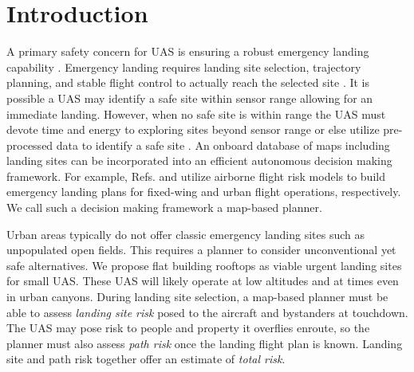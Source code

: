 \section{Introduction}

A primary safety concern for \ac{UAS} is ensuring a robust emergency landing capability \cite{winnefeld_unmanned_2011, degarmo_issues_2013}.  Emergency landing requires landing site selection, trajectory planning, and stable flight control to actually reach the selected site \cite{atkins_emergency_2006}. It is possible a UAS may identify a safe site within sensor range allowing for an immediate landing.  However, when no safe site is within range the UAS must devote time and energy to exploring sites beyond sensor range or else utilize pre-processed data to identify a safe site \cite{ten_harmsel_emergency_2017, ochoa_fail-safe_2017}.  An onboard database of maps including landing sites can be incorporated into an efficient autonomous decision making framework.  For example, Refs.  \cite{atkins_emergency_2006, meuleau_emergency_2009}  and \cite{sankararaman_towards_2017} utilize airborne flight risk models to build emergency landing plans for fixed-wing and urban flight operations, respectively. We call such a decision making framework a map-based planner.

Urban areas typically do not offer classic emergency landing sites such as unpopulated open fields. This requires a planner to consider unconventional yet safe alternatives. We propose flat building rooftops as viable urgent landing sites for small UAS.  These UAS will likely operate at low altitudes and at times even in urban canyons. During landing site selection, a map-based planner must be able to assess \emph{landing site risk} posed to the aircraft and bystanders at touchdown. The UAS may pose risk to people and property it overflies enroute, so the planner must also assess \emph{path risk} once the landing flight plan is known.  Landing site and path risk together offer an estimate of \emph{total risk}.

